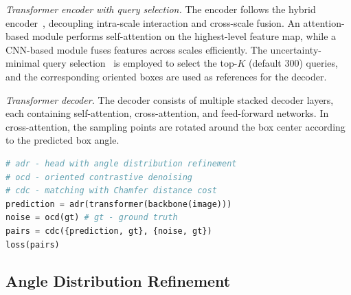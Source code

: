 \documentclass[lettersize,journal]{IEEEtran}
\begin{document}
\textit{Transformer encoder with query selection.} The encoder follows the hybrid encoder~\cite{rtdetr}, decoupling intra-scale interaction and cross-scale fusion. An attention-based module performs self-attention on the highest-level feature map, while a CNN-based module fuses features across scales efficiently. The uncertainty-minimal query selection~\cite{rtdetr} is employed to select the top-$K$ (default 300) queries, and the corresponding oriented boxes are used as references for the decoder.

\textit{Transformer decoder.} The decoder consists of multiple stacked decoder layers, each containing self-attention, cross-attention, and feed-forward networks. In cross-attention, the sampling points are rotated around the box center according to the predicted box angle. 


\begin{algorithm}[h]
    \caption{Training procedure pseudocode.}
   \label{algo}
\begin{lstlisting}[language=python, mathescape, breaklines=true]
# adr - head with angle distribution refinement
# ocd - oriented contrastive denoising
# cdc - matching with Chamfer distance cost
prediction = adr(transformer(backbone(image)))
noise = ocd(gt) # gt - ground truth
pairs = cdc({prediction, gt}, {noise, gt})
loss(pairs)
\end{lstlisting}
\end{algorithm}




\subsection{Angle Distribution Refinement}\label{sec:ADR}
\end{document}
